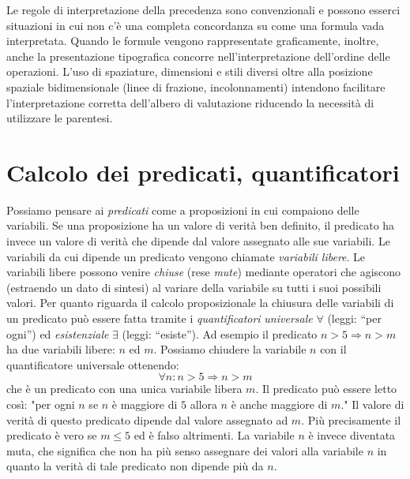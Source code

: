 \documentclass[italian,a4paper,hidelinks,headinclude]{scrartcl}
\newcommand{\myemph}[1]{\emph{#1}\marginpar{#1}}
\begin{document}
Le regole di interpretazione della precedenza sono convenzionali
e possono esserci situazioni in cui non c'è una completa concordanza su come
una formula vada interpretata.
Quando le formule vengono rappresentate graficamente, inoltre,
anche la presentazione tipografica concorre nell'interpretazione
dell'ordine delle operazioni.
L'uso di spaziature, dimensioni e stili diversi oltre alla
posizione spaziale bidimensionale (linee di frazione, incolonnamenti)
intendono facilitare
l'interpretazione corretta dell'albero di valutazione riducendo
la necessità di utilizzare le parentesi.
\begin{comment}
Esempi di formule di dubbia interpretazione in
cui l'uso delle parentesi sarebbe invece auspicabile:
\[
  x/2\,y,\qquad
  \sin x \cdot 2, \qquad
  {e^x}^2, \qquad
  \frac{\displaystyle\frac{x}{y}}{z}.
\]
\end{comment}

\section{Calcolo dei predicati, quantificatori}

Possiamo pensare ai \myemph{predicati} come a proposizioni in cui
compaiono delle variabili.
Se una proposizione ha un valore di verità ben definito, il predicato
ha invece un valore di verità che dipende dal valore assegnato alle sue
variabili. Le variabili da cui dipende un predicato vengono chiamate
\myemph{variabili libere}. Le variabili libere possono venire \emph{chiuse}
(rese \emph{mute}) mediante operatori che agiscono
(estraendo un dato di sintesi) al variare della variabile su tutti i
suoi possibili valori.
Per quanto riguarda il calcolo proposizionale la chiusura delle variabili
di un predicato può essere fatta tramite i \myemph{quantificatori}
\emph{universale} $\forall$ (leggi: ``per ogni'') ed
\emph{esistenziale} $\exists$ (leggi: ``esiste'').
Ad esempio il predicato
$n>5 \Rightarrow n>m$ ha due variabili libere: $n$ ed $m$.
Possiamo chiudere la variabile $n$ con il quantificatore universale ottenendo:
\[
  \forall n \colon n>5 \Rightarrow n>m
\]
che è un predicato con una unica variabile libera $m$.
Il predicato può essere letto così: "per ogni $n$ se $n$ è maggiore di $5$ allora $n$ è anche maggiore di $m$."
Il valore di verità di questo
predicato dipende dal valore assegnato ad $m$.
Più precisamente il predicato è vero se $m\le 5$ ed è falso altrimenti.
La variabile $n$ è invece diventata muta, che significa che non ha più senso
assegnare dei valori alla variabile $n$ in quanto la verità di tale predicato non dipende più da $n$.
\end{document}
